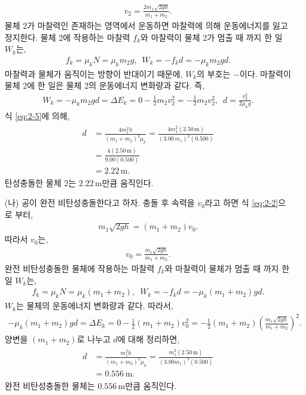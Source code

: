 \documentclass[floatfix,nofootinbib,superscriptaddress,fleqn]{revtex4-2}
\begin{document}
\begin{itemize}
\begin{align}
    v_2 = \frac{2m_1\sqrt{2gh}}{m_1+m_2}.
  \end{align}
  물체 2가 마찰력인 존재하는 영역에서 운동하면 마찰력에 의해 운동에너지를 잃고 정지한다.
  물체 2에 작용하는 마찰력 $f_k$와 마찰력이 물체 2가 멈출 때 까지 한 일 $W_k$는,
  \begin{align}
    f_k = \mu_kN = \mu_km_2g,\,\,\,W_k = -f_kd=-\mu_km_2gd.
  \end{align}
  마찰력과 물체가 움직이는 방향이 반대이기 때문에, $W_k$의 부호는 $-$이다. 
  마찰력이 물체 2에 한 일은 물체 2의 운동에너지 변화량과 같다. 즉,
  \begin{align}
  W_k = -\mu_km_2gd = \Delta E_k  
  = 0 - \frac{1}{2}m_2v_2^2 = - \frac{1}{2}m_2v_2^2
  ,\,\,\,d=\frac{v_2^2}{2\mu_k g}.
  \end{align}
  식 \eqref{eq:2-5}에 의해,
  \begin{align}
    \begin{split}
      d&=\frac{4m_1^2h}{(m_1+m_2)^2\mu_k}
      =\frac{4m_1^2(2.50\,\mathrm{m})}{(3.00\,m_1)^2(0.500)}   \\
       &=\frac{4(2.50\,\mathrm{m})}{9.00(0.500)}  \\
       &=2.22\,\mathrm{m}.
    \end{split}
  \end{align}
  탄성충돌한 물체 2는 $2.22\,\mathrm{m}$만큼 움직인다.
  \item[(나)] 공이 완전 비탄성충돌한다고 하자. 충돌 후 속력을 $v_0$라고 하면
   식 \eqref{eq:2-2}으로 부터,
  \begin{align}
    m_1\sqrt{2gh} = (m_1 + m_2) v_0.
  \end{align}
  따라서 $v_0$는,
  \begin{align}
    v_0 = \frac{m_1\sqrt{2gh}}{m_1 + m_2}.
  \end{align}
  완전 비탄성충돌한 물체에 작용하는 마찰력 $f_k$와 마찰력이 물체가 멈출 때 까지 
  한 일 $W_k$는,
  \begin{align}
    f_k = \mu_k N = \mu_k(m_1+m_2),\,\,\,W_k = -f_kd=-\mu_k(m_1+m_2)gd.
  \end{align}
  $W_k$는 물체의 운동에너지 변화량과 같다. 따라서,
  \begin{align}
    -\mu_k(m_1+m_2)gd = \Delta E_k 
    = 0-\frac{1}{2}(m_1+m_2)v^2_0 = -\frac{1}{2}(m_1+m_2)
    \left( \frac{m_1\sqrt{2gh}}{m_1 + m_2} \right)^2.
  \end{align}
  양변을 $(m_1+m_2)$로 나누고 $d$에 대해 정리하면,
  \begin{align}
    \begin{split}
      d &= \frac{m_1^2h}{(m_1+m_2)^2\mu_k} 
        = \frac{m_1^2(2.50\,\mathrm{m})}{(3.00m_1)^2(0.500)}  \\
      &= 0.556\,\mathrm{m}.
    \end{split}
  \end{align}
  완전 비탄성충돌한 물체는 $0.556\,\mathrm{m}$만큼 움직인다.
  \end{itemize}
\end{document}
